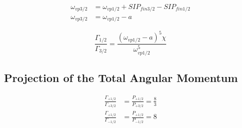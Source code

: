 \begin{align}
  \omega_{vp3/2} &= \omega_{vp1/2} + SIP_{fin3/2} - SIP_{fin1/2} \\
  \omega_{vp3/2} &= \omega_{vp1/2} - a
\end{align}

\begin{equation}
  \frac{\Gamma_{1/2}}{\Gamma_{3/2}} = \frac{(\omega_{vp1/2} -a)^5 \chi}{\omega_{vp1/2}^5}
\end{equation}



\subsection{Projection of the Total Angular Momentum}

\begin{align}
  \frac{\Gamma_{+1/2}}{\Gamma_{+3/2}} &= \frac{P_{+1/2}}{P_{+3/2}} = \frac 83  \\
  \frac{\Gamma_{+1/2}}{\Gamma_{-1/2}} &= \frac{P_{+1/2}}{P_{-1/2}} = 8 
\end{align}

%
%
%
%
%
%
%
%
%
